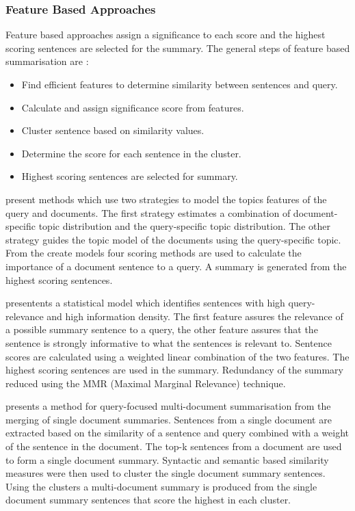 \subsubsection{Feature Based Approaches}
Feature based approaches assign a significance to each score and the highest scoring sentences are selected for the summary. The general steps of feature based summarisation are \citep{rahman2015survey}:

\begin{itemize}
      \itemsep0em 
      \item Find efficient features to determine similarity between sentences and query.
      \item Calculate and assign significance score from features.
      \item Cluster sentence based on similarity values.
      \item Determine the score for each sentence in the cluster.
      \item Highest scoring sentences are selected for summary.
\end{itemize}

\citet{tang2009multi} present methods which use two strategies to model the topics features of the query and documents. The first strategy estimates a combination of document-specific topic distribution and the query-specific topic distribution. The other strategy guides the topic model of the documents using the query-specific topic. From the create models four scoring methods are used to calculate the importance of a document sentence to a query. A summary is generated from the highest scoring sentences. 

\citet{ye2008query} presentents a statistical model which identifies sentences with high query-relevance and high information density. The first feature assures the relevance of a possible summary sentence to a query, the other feature assures that the sentence is strongly informative to what the sentences is relevant to. Sentence scores are calculated using a weighted linear combination of the two features. The highest scoring sentences are used in the summary. Redundancy of the summary reduced using the MMR (Maximal Marginal Relevance) technique. 

\citet{gupta2012multi} presents a method for query-focused multi-document summarisation from the merging of single document summaries. Sentences from a single document are extracted based on the similarity of a sentence and query combined with a weight of the sentence in the document. The top-k sentences from a document are used to form a single document summary. Syntactic and semantic based similarity measures were then used to cluster the single document summary sentences. Using the clusters a multi-document summary is produced from the single document summary sentences that score the highest in each cluster.

